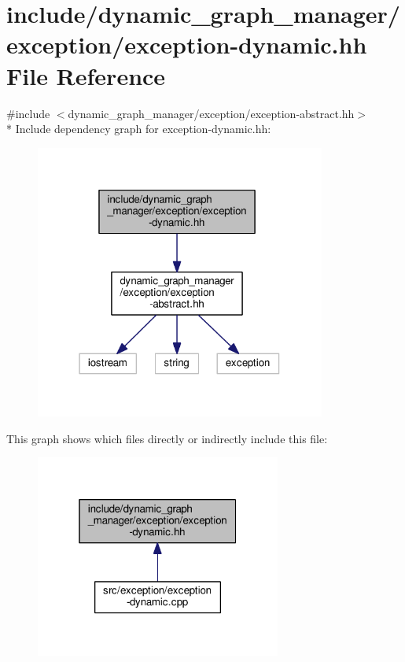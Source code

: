 \hypertarget{exception-dynamic_8hh}{}\section{include/dynamic\+\_\+graph\+\_\+manager/exception/exception-\/dynamic.hh File Reference}
\label{exception-dynamic_8hh}
{\ttfamily \#include $<$dynamic\+\_\+graph\+\_\+manager/exception/exception-\/abstract.\+hh$>$}\\*
Include dependency graph for exception-\/dynamic.hh\+:
\nopagebreak
\begin{figure}[H]
\begin{center}
\leavevmode
\includegraphics[width=271pt]{exception-dynamic_8hh__incl}
\end{center}
\end{figure}
This graph shows which files directly or indirectly include this file\+:
\nopagebreak
\begin{figure}[H]
\begin{center}
\leavevmode
\includegraphics[width=229pt]{exception-dynamic_8hh__dep__incl}
\end{center}
\end{figure}
